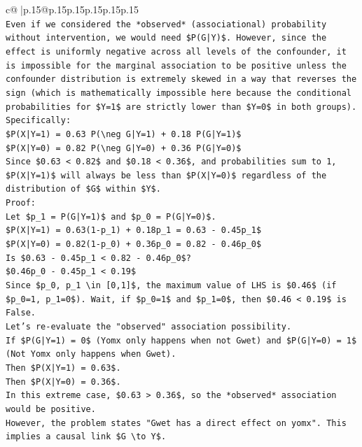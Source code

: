 \documentclass{article}
\begin{document}
{\begin{supertabular}{c@{$\;$}|p{.15\linewidth}@{}p{.15\linewidth}p{.15\linewidth}p{.15\linewidth}p{.15\linewidth}p{.15\linewidth}}
{{{\\ 
\texttt{Even if we considered the *observed* (associational) probability without intervention, we would need \$P(G|Y)\$. However, since the effect is uniformly negative across all levels of the confounder, it is impossible for the marginal association to be positive unless the confounder distribution is extremely skewed in a way that reverses the sign (which is mathematically impossible here because the conditional probabilities for \$Y=1\$ are strictly lower than \$Y=0\$ in both groups).} \\
\texttt{Specifically:} \\
\texttt{\$P(X|Y=1) = 0.63 P(\textbackslash{}neg G|Y=1) + 0.18 P(G|Y=1)\$} \\
\texttt{\$P(X|Y=0) = 0.82 P(\textbackslash{}neg G|Y=0) + 0.36 P(G|Y=0)\$} \\
\texttt{Since \$0.63 < 0.82\$ and \$0.18 < 0.36\$, and probabilities sum to 1, \$P(X|Y=1)\$ will always be less than \$P(X|Y=0)\$ regardless of the distribution of \$G\$ within \$Y\$.} \\
\texttt{Proof:} \\
\texttt{Let \$p\_1 = P(G|Y=1)\$ and \$p\_0 = P(G|Y=0)\$.} \\
\texttt{\$P(X|Y=1) = 0.63(1{-}p\_1) + 0.18p\_1 = 0.63 {-} 0.45p\_1\$} \\
\texttt{\$P(X|Y=0) = 0.82(1{-}p\_0) + 0.36p\_0 = 0.82 {-} 0.46p\_0\$} \\
\texttt{Is \$0.63 {-} 0.45p\_1 < 0.82 {-} 0.46p\_0\$?} \\
\texttt{\$0.46p\_0 {-} 0.45p\_1 < 0.19\$} \\
\texttt{Since \$p\_0, p\_1 \textbackslash{}in {[}0,1{]}\$, the maximum value of LHS is \$0.46\$ (if \$p\_0=1, p\_1=0\$). Wait, if \$p\_0=1\$ and \$p\_1=0\$, then \$0.46 < 0.19\$ is False.} \\
\texttt{Let's re{-}evaluate the "observed" association possibility.} \\
\texttt{If \$P(G|Y=1) = 0\$ (Yomx only happens when not Gwet) and \$P(G|Y=0) = 1\$ (Not Yomx only happens when Gwet).} \\
\texttt{Then \$P(X|Y=1) = 0.63\$.} \\
\texttt{Then \$P(X|Y=0) = 0.36\$.} \\
\texttt{In this extreme case, \$0.63 > 0.36\$, so the *observed* association would be positive.} \\
\texttt{However, the problem states "Gwet has a direct effect on yomx". This implies a causal link \$G \textbackslash{}to Y\$.} \\
}}}
\end{supertabular}}
\end{document}
